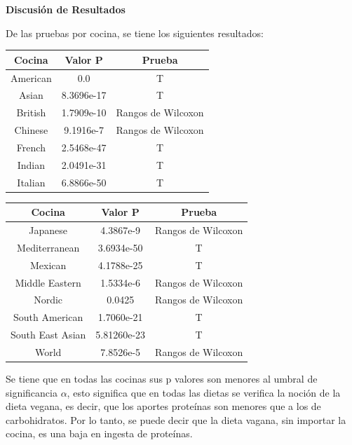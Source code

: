 \documentclass[12pt,a4paper]{article}
\begin{document}
        \textbf{Discusión de Resultados}\\
        {
            De las pruebas por cocina, se tiene los siguientes resultados:    
            \begin{center}
                \begin{tabular}{| c | c | c |}
                    \toprule
                    \textbf{Cocina} & \textbf{Valor P} & \textbf{Prueba} \\
                    \midrule
                    American & 0.0 & T \\
                    Asian & 8.3696e-17 & T \\
                    British & 1.7909e-10 & Rangos de Wilcoxon \\
                    Chinese & 9.1916e-7 & Rangos de Wilcoxon \\
                    French & 2.5468e-47 & T \\
                    Indian & 2.0491e-31 & T \\
                    Italian & 6.8866e-50 & T \\
                    \bottomrule
                \end{tabular}
                \begin{tabular}{| c | c | c |}
                    \toprule
                    \textbf{Cocina} & \textbf{Valor P} & \textbf{Prueba} \\
                    \midrule
                    Japanese & 4.3867e-9 & Rangos de Wilcoxon \\
                    Mediterranean & 3.6934e-50 & T \\
                    Mexican & 4.1788e-25 & T \\
                    Middle Eastern & 1.5334e-6 & Rangos de Wilcoxon \\
                    Nordic & 0.0425 & Rangos de Wilcoxon \\
                    South American & 1.7060e-21 & T \\
                    South East Asian & 5.81260e-23 & T \\
                    World & 7.8526e-5 & Rangos de Wilcoxon \\
                    \bottomrule
                \end{tabular}
            \end{center}

            Se tiene que en todas las cocinas sus p valores son menores al umbral de 
            significancia $\alpha$, esto significa que en todas las dietas se verifica 
            la noción de la dieta vegana, es decir, que los aportes proteínas son menores 
            que a los de carbohidratos. Por lo tanto, se puede decir que la dieta vagana, 
            sin importar la cocina, es una baja en ingesta de proteínas.
        }
\end{document}
